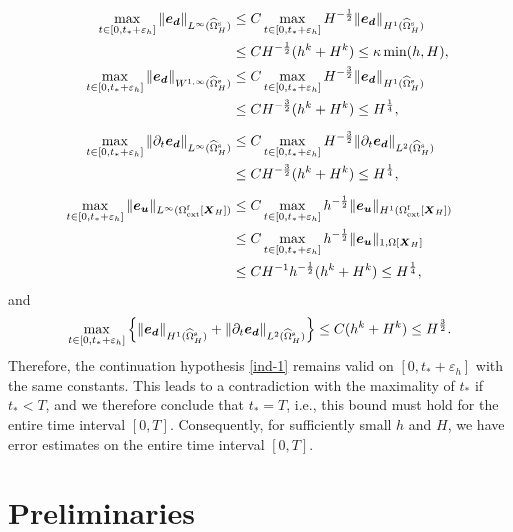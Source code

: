 \documentclass[11pt,reqno]{amsart}
\theoremstyle{definition}
\theoremstyle{plain}
\numberwithin{theorem}{section}
\numberwithin{proposition}{section}
\numberwithin{lemma}{section}
\numberwithin{equation}{section}
\newcommand{\bs}[1]{\boldsymbol{#1}}
\newcommand{\dep}{{{\bs{d}}}}
\renewcommand{\(}{\bigl(}
\renewcommand{\)}{\bigr)}
\begin{document}
\begin{align}
\max_{t\in[0,t_*+\varepsilon_{h}]}\|{\bs e}_\dep\|_{L^\infty(\widehat{\Omega}^{\rm s}_H)} 
&\leq 
C\max_{t\in[0,t_*+\varepsilon_{h}]} H^{-\frac12}\|{\bs e}_\dep\|_{H^1(\widehat{\Omega}^{\rm s}_H)} \notag\\
&\leq 
CH^{-\frac12} (h^k+H^k) 
\leq \kappa \min(h,H),\\
\max_{t\in[0,t_*+\varepsilon_{h}]} \|{\bs e}_\dep\|_{W^{1,\infty}(\widehat{\Omega}^{\rm s}_H)} 
&\leq 
C\max_{t\in[0,t_*+\varepsilon_{h}]} H^{-\frac32}\|{\bs e}_\dep\|_{H^1(\widehat{\Omega}^{\rm s}_H)} \notag\\
&\leq 
CH^{-\frac32} (h^k+H^k)  
\leq H^{\frac14} ,\\[5pt]
\max_{t\in[0,t_*+\varepsilon_{h}]} \|\partial_t{\bs e}_\dep\|_{L^\infty(\widehat{\Omega}^{\rm s}_H)} 
&\leq 
C\max_{t\in[0,t_*+\varepsilon_{h}]} H^{-\frac32} \|\partial_t{\bs e}_\dep\|_{L^2(\widehat{\Omega}^{\rm s}_H)} \notag\\
&\leq 
CH^{-\frac32} (h^k+H^k) 
\leq H^{\frac14} ,\\[5pt]
\max_{t\in[0,t_*+\varepsilon_{h}]} \|{\bs e}_{\bs u}\|_{L^\infty(\Omega^{\rm f}_{\rm ext}[\bs X_H])} 
&\leq 
C\max_{t\in[0,t_*+\varepsilon_{h}]} h^{-\frac12} \|{\bs e}_{\bs u}\|_{H^1(\Omega^{\rm f}_{\rm ext}[\bs X_H])} \notag\\
&\leq 
C\max_{t\in[0,t_*+\varepsilon_{h}]} h^{-\frac12} \|{\bs e}_{\bs u}\|_{1,\Omega[{\bs X}_H]} \notag\\
&\leq 
CH^{-1}h^{-\frac12} (h^k+H^k)
\leq H^{\frac14} ,
\end{align}
and
\begin{align}
\max_{t\in[0,t_*+\varepsilon_{h}]}\left\{ \|{\bs e}_\dep\|_{H^1(\widehat{\Omega}^{\rm s}_H)} 
+\|\partial_t{\bs e}_\dep\|_{L^2(\widehat{\Omega}^{\rm s}_H)} \right\} 
\leq C(h^k+H^k) 
\leq H^{\frac32}.
\end{align}
Therefore, the continuation hypothesis \eqref{ind-1} remains valid on $[0,t_*+\varepsilon_{h}]$ with the same constants. 
This leads to a contradiction with the maximality of $t_*$ if $t_*<T$, and we therefore conclude that $t_*=T$, i.e., this bound must hold for the entire time interval $[0,T]$. Consequently, for sufficiently small $h$ and $H$, we have error estimates on the entire time interval $[0,T]$. 


\section{Preliminaries}\label{sect:prelim}
\end{document}
